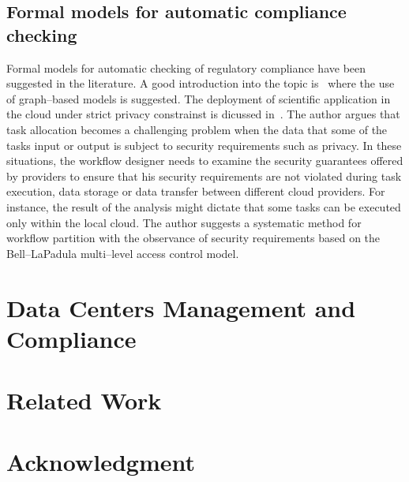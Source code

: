 \documentclass[runningheads,a4paper]{llncs}
\begin{document}
\subsection{Formal models for automatic compliance checking}
Formal models for automatic checking of regulatory compliance have been
suggested in the literature. A good introduction into
the topic is~\cite{Becker2012} where the use of graph--based
models is suggested. 
The deployment of scientific application in the cloud
under strict privacy constrainst is dicussed in~\cite{Watson2011}.
The author argues that task allocation becomes a challenging problem when
the data that some of the tasks input or output is subject
to security requirements such as privacy.  In these situations, 
the workflow designer needs to examine the security guarantees offered
by providers to ensure that his security requirements are
not violated during task execution, data storage or data transfer between
different cloud providers. For instance,  the result of the
analysis might dictate that some tasks can be executed only
within the local cloud. The author suggests a systematic method for workflow
partition with the observance of security requirements based 
on the Bell--LaPadula multi--level access control 
model. 
 

\section{Data Centers Management and Compliance}



\section{Related Work}

\cite{Vaquero2011}

\cite{Millard2013}

\cite{Mitrakas2013}

\section*{Acknowledgment}




\end{document}
